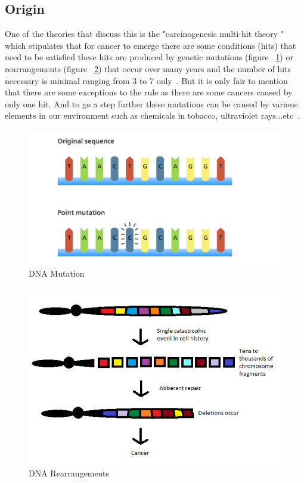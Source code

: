 \subsection{Origin}
        One of the theories that discuss this is the "carcinogenesis multi-hit theory " which stipulates that for cancer to emerge there are some conditions (hits) that need to be satisfied these hits are produced by genetic mutations (figure ~\ref{fig:mutations}) or rearrangements (figure ~\ref{fig:reaarangement}) that occur over many years and the number of hits necessary is minimal ranging from 3 to 7 only~\cite{rachita2021}. But it is only fair to mention that there are some exceptions to the rule as there are some cancers caused by only one hit. And to go a step further these mutations can be caused by various elements in our environment such as chemicals in tobacco, ultraviolet rays...etc~\cite{whatiscancer2021}.
\begin{figure}[htbp]
\begin{center}
\includegraphics[width=15cm]{./chapter-01-general-medical-information/mutation.png}
\end{center}
\caption{DNA Mutation ~\cite{mutations}}
\label{fig:mutations}
\end{figure}
\begin{figure}[htbp]
\begin{center}
\includegraphics[width=15cm]{./chapter-01-general-medical-information/dna-rearrangement.png}
\end{center}
\caption{DNA Rearrangements ~\cite{reaarangement}}
\label{fig:reaarangement}
\end{figure}
